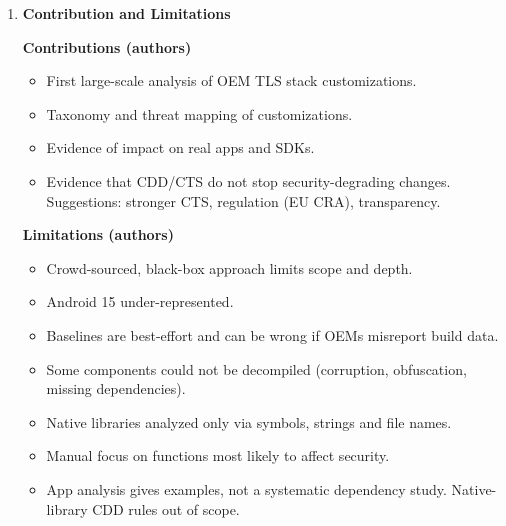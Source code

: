 \documentclass[11pt,a4paper]{article}
\newcommand{\entrypart}[1]{\textbf{\color{accent}#1}\par\vspace{2pt}}
\begin{document}
\begin{enumerate}
\begin{itemize}
        \item \textbf{Endpoint verification:} 1,721 models with varying implementations (e.g., missing hostname verifier or DNS override).
        \item \textbf{Apps:} over 75\% of 20k apps use at least one modified or missing TLS function.
        \begin{itemize}
            \item Certificate check (JSSE \texttt{X509Certificate.verify}) and OkHttp \texttt{Response.handshake} used by 73\%.
            \item Mintegral SDK affected by the MIUI bug.
            \item Temple Run 2, ShareChat, Citibank handle missing APIs correctly.
        \end{itemize}
        \item \textbf{Patching:} incomplete TLS updates in 2,539 models (16\%) from 85 OEMs. E.g., Samsung A50/A70 miss 33 Conscrypt updates.
        \item \textbf{CDD (Google-certified only):} 85\% of OEMs fail to maintain the trust store. At least 9\% report inconsistent versions. 27\% violate API restrictions.
    \end{itemize}

    \item \entrypart{Contribution and Limitations}

    \textbf{Contributions (authors)}
    \begin{itemize}
        \item First large-scale analysis of OEM TLS stack customizations.
        \item Taxonomy and threat mapping of customizations.
        \item Evidence of impact on real apps and SDKs.
        \item Evidence that CDD/CTS do not stop security-degrading changes. Suggestions: stronger CTS, regulation (EU CRA), transparency.
    \end{itemize}

    \vspace{4pt}
    \textbf{Limitations (authors)}
    \begin{itemize}
        \item Crowd-sourced, black-box approach limits scope and depth.
        \item Android 15 under-represented.
        \item Baselines are best-effort and can be wrong if OEMs misreport build data.
        \item Some components could not be decompiled (corruption, obfuscation, missing dependencies).
        \item Native libraries analyzed only via symbols, strings and file names.
        \item Manual focus on functions most likely to affect security.
        \item App analysis gives examples, not a systematic dependency study. Native-library CDD rules out of scope.
    \end{itemize}


\end{enumerate}
\end{document}
